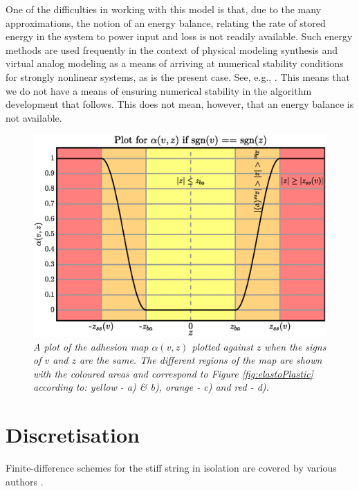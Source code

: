 \documentclass[twoside,a4paper,dvipsnames]{article}
\begin{document}
One of the difficulties in working with this model is that, due to the many approximations, the notion of an energy balance, relating the rate of stored energy in the system to power input and loss is not readily available. Such energy methods are used frequently in the context of physical modeling synthesis and virtual analog modeling as a means of arriving at numerical stability conditions for strongly nonlinear systems, as is the present case. See, e.g., \cite{Bilbao2009}. This means that we do not have a means of ensuring numerical stability in the algorithm development that follows. This does not mean, however, that an energy balance is not available. 

\begin{figure}[ht]
\centerline{\includegraphics[width=1.0\columnwidth]{drawAlpha.eps}}
\caption{\label{fig:alphaPlot}{\it A plot of the adhesion map $\alpha(v,z)$ plotted against $z$ when the signs of $v$ and $z$ are the same. The different regions of the map are shown with the coloured areas and correspond to Figure \ref{fig:elastoPlastic} according to: yellow - a) \& b), orange - c) and red - d).}}
\end{figure}

\section{Discretisation}\label{sec:discretisation}
Finite-difference schemes for the stiff string in isolation are covered by various authors \cite{Chaigne, Bilbao2009}. 
\end{document}
